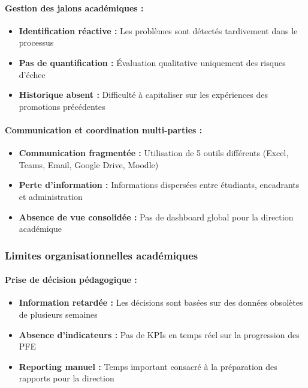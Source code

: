 \paragraph{Gestion des jalons académiques :}
\begin{itemize}
    \item \textbf{Identification réactive :} Les problèmes sont détectés tardivement dans le processus
    \item \textbf{Pas de quantification :} Évaluation qualitative uniquement des risques d'échec
    \item \textbf{Historique absent :} Difficulté à capitaliser sur les expériences des promotions précédentes
\end{itemize}

\paragraph{Communication et coordination multi-parties :}
\begin{itemize}
    \item \textbf{Communication fragmentée :} Utilisation de 5 outils différents (Excel, Teams, Email, Google Drive, Moodle)
    \item \textbf{Perte d'information :} Informations dispersées entre étudiants, encadrants et administration
    \item \textbf{Absence de vue consolidée :} Pas de dashboard global pour la direction académique
\end{itemize}

\subsubsection{Limites organisationnelles académiques}

\paragraph{Prise de décision pédagogique :}
\begin{itemize}
    \item \textbf{Information retardée :} Les décisions sont basées sur des données obsolètes de plusieurs semaines
    \item \textbf{Absence d'indicateurs :} Pas de KPIs en temps réel sur la progression des PFE
    \item \textbf{Reporting manuel :} Temps important consacré à la préparation des rapports pour la direction
\end{itemize}


